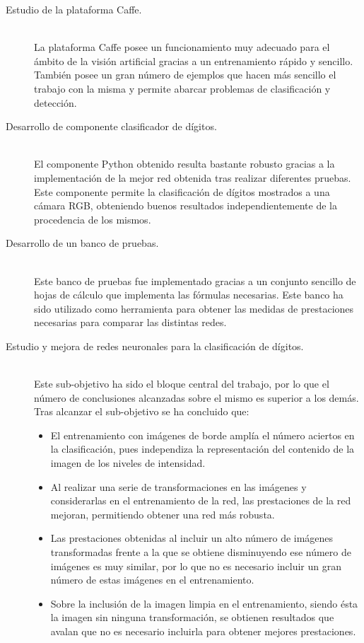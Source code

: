 \begin{description}
	\item[Estudio de la plataforma Caffe.] \hfill 
	\vspace{5pt}
	\\
	La plataforma Caffe posee un funcionamiento muy adecuado para el ámbito de la visión artificial gracias a un entrenamiento rápido y sencillo. También posee un gran número de ejemplos que hacen más sencillo el trabajo con la misma y permite abarcar problemas de clasificación y detección.
	\item[Desarrollo de componente clasificador de dígitos.] \hfill 
	\vspace{5pt}
	\\
	El componente Python obtenido resulta bastante robusto gracias a la implementación de la mejor red obtenida tras realizar diferentes pruebas. Este componente permite la clasificación de dígitos mostrados a una cámara RGB, obteniendo buenos resultados independientemente de la procedencia de los mismos.\\
	\item[Desarrollo de un banco de pruebas.] \hfill 
	\vspace{5pt}
	\\
	Este banco de pruebas fue implementado gracias a un conjunto sencillo de hojas de cálculo que implementa las fórmulas necesarias. Este banco ha sido utilizado como herramienta para obtener las medidas de prestaciones necesarias para comparar las distintas redes.
	\item[Estudio y mejora de redes neuronales para la clasificación de dígitos.] \hfill 
	\vspace{5pt}
	\\
	Este sub-objetivo ha sido el bloque central del trabajo, por lo que el número de conclusiones alcanzadas sobre el mismo es superior a los demás. Tras alcanzar el sub-objetivo se ha concluido que:
	\begin{itemize}
		\item El entrenamiento con imágenes de borde amplía el número aciertos en la clasificación, pues independiza la representación del contenido de la imagen de los niveles de intensidad.
		\item Al realizar una serie de  transformaciones en las imágenes y considerarlas en el entrenamiento de la red, las prestaciones de la red mejoran, permitiendo obtener una red más robusta.
		\item Las prestaciones obtenidas al incluir un alto número de imágenes transformadas frente a la que se obtiene disminuyendo ese número de imágenes es muy similar, por lo que no es necesario incluir un gran número de estas imágenes en el entrenamiento.
		\item Sobre la inclusión de la imagen limpia en el entrenamiento, siendo ésta la imagen sin ninguna transformación, se obtienen resultados que avalan que no es necesario incluirla para obtener mejores prestaciones.
	\end{itemize}


\end{description}

